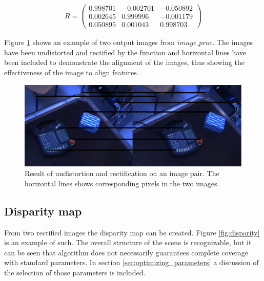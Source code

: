 \begin{equation}\label{eq:rectification}
\begin{split}
R =
 \begin{pmatrix}
  0.998701 & -0.002701 & -0.050892 \\
  0.002645 & 0.999996 & -0.001179 \\
  0.050895 & 0.001043 & 0.998703 
 \end{pmatrix}
\end{split}
\end{equation}

Figure \ref{fig:rectified} shows an example of two output images from $image\_proc$. The images have been undistorted and rectified by the function and horizontal lines have been included to demonstrate the alignment of the images, thus showing the effectiveness of the image to align features.

\begin{figure}[h!]
  \centering
    \includegraphics[width=\textwidth]{graphics/06_vision/rectified.jpg}
      \caption{Result of undistortion and rectification on an image pair. The horizontal lines shows corresponding pixels in the two images.}
    \label{fig:rectified}
\end{figure}

\subsection{Disparity map}

From two rectified images the disparity map can be created. Figure \ref{fig:disparity} is an example of such. The overall structure of the scene is recognizable, but it can be seen that algorithm does not necessarily guarantees complete coverage with standard parameters. In section \ref{sec:optimizing_parameters} a discussion of the selection of those parameters is included.

